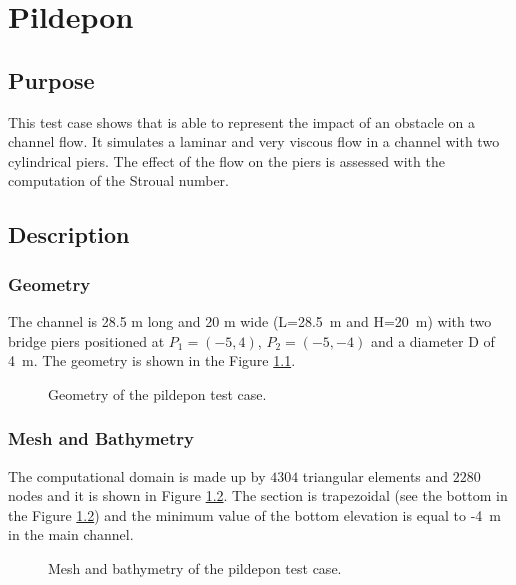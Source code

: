 \chapter{Pildepon}
%
%
\section{Purpose}

This test case shows that  is able to represent the impact of an obstacle on a channel flow. 
It simulates a laminar and very viscous flow in a channel with two cylindrical piers. The effect of the flow
on the piers is assessed with the computation of the Stroual number.

\section{Description}

\subsection{Geometry}

The channel is 28.5 m long and 20 m wide (L=28.5~m and H=20~m) with two bridge piers positioned at $P_1=(-5,4)$, $P_2=(-5,-4)$ and a diameter D of 4~m.
The geometry is shown in the Figure \ref{fig:geo:bridge}.

\begin{figure}[H]
 \centering
 \caption{Geometry of the pildepon test case.}
 \label{fig:geo:bridge}
\end{figure}

\subsection{Mesh and Bathymetry}

The computational domain is made up by $4304$ triangular elements and $2280$ nodes and it is shown in Figure \ref{fig:mesh:bridge}.
The section is trapezoidal (see the bottom in the Figure \ref{fig:mesh:bridge}) and the minimum value of the bottom elevation is equal to -4~m in the main channel.

\begin{figure}[H]
\begin{minipage}[t]{0.45\textwidth}
 \centering
\end{minipage}%
\begin{minipage}[t]{0.55\textwidth}
 \centering
\end{minipage}
 \caption{Mesh and bathymetry of the pildepon test case.}
 \label{fig:mesh:bridge}
\end{figure}

